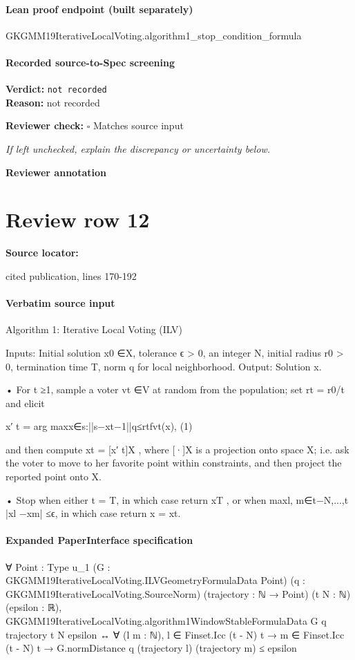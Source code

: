 \documentclass[10pt]{article}
\newcommand{\reviewerbox}{%
  \par\noindent\fbox{\parbox{0.96\linewidth}{\rule{0pt}{0.38in}}}\par
}
\newcommand{\reviewmatch}[1]{%
  \par\noindent\textbf{Reviewer check:} $\square$\; #1\par
  \noindent\emph{If left unchecked, explain the discrepancy or uncertainty below.}\par
}
\begin{document}
\paragraph{Lean proof endpoint (built separately)}\begin{ReviewVerbatim}
GKGMM19IterativeLocalVoting.algorithm1_stop_condition_formula
\end{ReviewVerbatim}

\paragraph{Recorded source-to-Spec screening}
\textbf{Verdict:} \texttt{not recorded}
\\
\textbf{Reason:} not recorded
\reviewmatch{Matches source input}
\noindent\textbf{Reviewer annotation}\par
\reviewerbox
\clearpage
\hypertarget{source-claim-d399110cb2008aaf}{}
\section*{Review row 12}
\textbf{Source locator:} {\footnotesize\raggedright cited publication, lines 170-\allowbreak{}192\par}
\paragraph{Verbatim source input}
\begin{ReviewVerbatim}
Algorithm 1: Iterative Local Voting (ILV)

Inputs:
Initial solution x0 ∈X, tolerance ϵ > 0, an integer N, initial radius r0 > 0,
termination time T, norm q for local neighborhood.
Output:
Solution x.

• For t ≥1, sample a voter vt ∈V at random from the population; set rt = r0/t
and elicit

x′
t = arg maxx∈{s:||s−xt−1||q≤rt}fvt(x),
(1)

and then compute xt = [x′
t]X , where [·]X is a projection onto space X; i.e. ask
the voter to move to her favorite point within constraints, and then project the
reported point onto X.

• Stop when either t = T, in which case return xT , or when
maxl, m∈{t−N,...,t} |xl −xm| ≤ϵ, in which case return x = xt.
\end{ReviewVerbatim}


\paragraph{Expanded PaperInterface specification}
\begin{ReviewVerbatim}
∀ {Point : Type u_1} (G : GKGMM19IterativeLocalVoting.ILVGeometryFormulaData Point)
  (q : GKGMM19IterativeLocalVoting.SourceNorm) (trajectory : ℕ → Point) (t N : ℕ) (epsilon : ℝ),
  GKGMM19IterativeLocalVoting.algorithm1WindowStableFormulaData G q trajectory t N epsilon ↔
    ∀ (l m : ℕ),
      l ∈ Finset.Icc (t - N) t → m ∈ Finset.Icc (t - N) t → G.normDistance q (trajectory l) (trajectory m) ≤ epsilon
\end{ReviewVerbatim}
\end{document}
